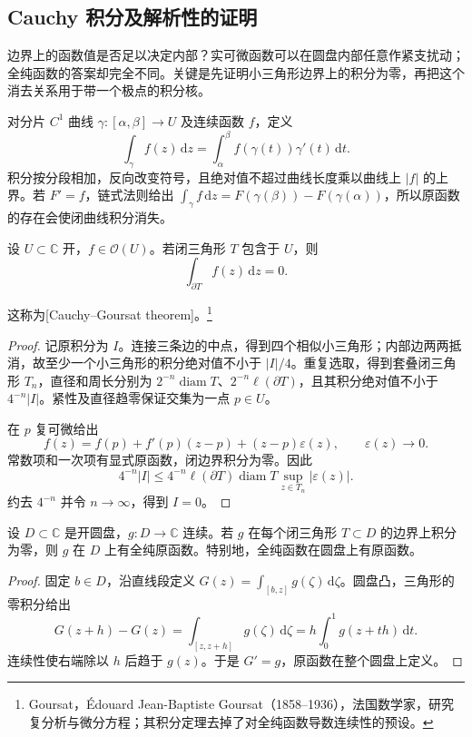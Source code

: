 \subsection{Cauchy 积分及解析性的证明}
\label{g4:subsec:0101:02}
边界上的函数值是否足以决定内部？实可微函数可以在圆盘内部任意作紧支扰动；全纯函数的答案却完全不同。关键是先证明小三角形边界上的积分为零，再把这个消去关系用于带一个极点的积分核。

\ProseParagraphBreak

对分片 \(C^1\) 曲线 \(\gamma:[\alpha,\beta]\to U\) 及连续函数 \(f\)，定义
\[
	\int_\gamma f(z)\,\mathrm{d}z
	=\int_\alpha^\beta f(\gamma(t))\gamma'(t)\,\mathrm{d}t.
\]
积分按分段相加，反向改变符号，且绝对值不超过曲线长度乘以曲线上 \(|f|\) 的上界。若 \(F'=f\)，链式法则给出 \(\int_\gamma f\,\mathrm{d}z=F(\gamma(\beta))-F(\gamma(\alpha))\)，所以原函数的存在会使闭曲线积分消失。

\begin{theorem}
	\label{g4:thm:0101:goursat}
	设 \(U\subset\mathbb C\) 开，\(f\in\mathcal O(U)\)。若闭三角形 \(T\) 包含于 \(U\)，则
	\[
		\int_{\partial T}f(z)\,\mathrm{d}z=0.
	\]
\end{theorem}
这称为[Cauchy--Goursat theorem]。\footnote{Goursat，Édouard Jean-Baptiste Goursat（1858--1936），法国数学家，研究复分析与微分方程；其积分定理去掉了对全纯函数导数连续性的预设。}
\begin{proof}
	记原积分为 \(I\)。连接三条边的中点，得到四个相似小三角形；内部边两两抵消，故至少一个小三角形的积分绝对值不小于 \(|I|/4\)。重复选取，得到套叠闭三角形 \(T_n\)，直径和周长分别为 \(2^{-n}\operatorname{diam}T\)、\(2^{-n}\ell(\partial T)\)，且其积分绝对值不小于 \(4^{-n}|I|\)。紧性及直径趋零保证交集为一点 \(p\in U\)。

	在 \(p\) 复可微给出
	\[
		f(z)=f(p)+f'(p)(z-p)+(z-p)\varepsilon(z),\qquad \varepsilon(z)\longrightarrow0.
	\]
	常数项和一次项有显式原函数，闭边界积分为零。因此
	\[
		4^{-n}|I|\le 4^{-n}\ell(\partial T)\operatorname{diam}T
		\sup_{z\in T_n}|\varepsilon(z)|.
	\]
	约去 \(4^{-n}\) 并令 \(n\to\infty\)，得到 \(I=0\)。
\end{proof}

\begin{lemma}
	\label{g4:lem:0101:primitive}
	设 \(D\subset\mathbb C\) 是开圆盘，\(g:D\to\mathbb C\) 连续。若 \(g\) 在每个闭三角形 \(T\subset D\) 的边界上积分为零，则 \(g\) 在 \(D\) 上有全纯原函数。特别地，全纯函数在圆盘上有原函数。
\end{lemma}
\begin{proof}
	固定 \(b\in D\)，沿直线段定义 \(G(z)=\int_{[b,z]}g(\zeta)\,\mathrm{d}\zeta\)。圆盘凸，三角形的零积分给出
	\[
		G(z+h)-G(z)=\int_{[z,z+h]}g(\zeta)\,\mathrm{d}\zeta
		=h\int_0^1g(z+th)\,\mathrm{d}t.
	\]
	连续性使右端除以 \(h\) 后趋于 \(g(z)\)。于是 \(G'=g\)，原函数在整个圆盘上定义。
\end{proof}

